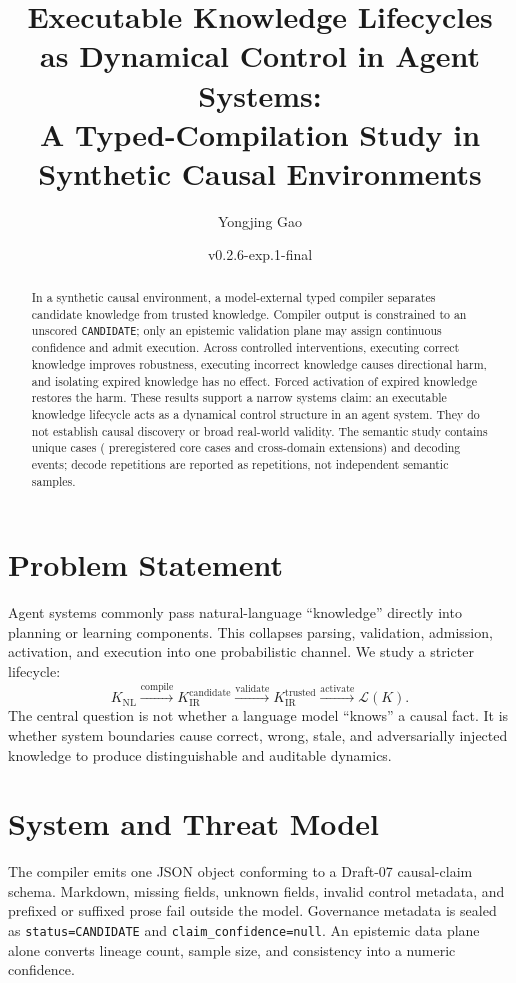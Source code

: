 \documentclass[10pt,twocolumn]{article}
\title{Executable Knowledge Lifecycles as Dynamical Control in Agent Systems:\\
A Typed-Compilation Study in Synthetic Causal Environments}
\author{Yongjing Gao}
\date{v0.2.6-exp.1-final}
\begin{document}
\maketitle

\begin{abstract}
In a synthetic causal environment, a model-external typed compiler separates candidate knowledge from trusted knowledge. Compiler output is constrained to an unscored \texttt{CANDIDATE}; only an epistemic validation plane may assign continuous confidence and admit execution. Across controlled interventions, executing correct knowledge improves robustness, executing incorrect knowledge causes directional harm, and isolating expired knowledge has no effect. Forced activation of expired knowledge restores the harm. These results support a narrow systems claim: an executable knowledge lifecycle acts as a dynamical control structure in an agent system. They do not establish causal discovery or broad real-world validity. The semantic study contains \UniqueCases{} unique cases (\CoreCases{} preregistered core cases and \ExtensionCases{} cross-domain extensions) and \TotalEvents{} decoding events; decode repetitions are reported as repetitions, not independent semantic samples.
\end{abstract}

\section{Problem Statement}
Agent systems commonly pass natural-language ``knowledge'' directly into planning or learning components. This collapses parsing, validation, admission, activation, and execution into one probabilistic channel. We study a stricter lifecycle:
\begin{equation}
K_{\mathrm{NL}} \xrightarrow{\text{compile}} K_{\mathrm{IR}}^{\mathrm{candidate}}
\xrightarrow{\text{validate}} K_{\mathrm{IR}}^{\mathrm{trusted}}
\xrightarrow{\text{activate}} \mathcal{L}(K).
\end{equation}
The central question is not whether a language model ``knows'' a causal fact. It is whether system boundaries cause correct, wrong, stale, and adversarially injected knowledge to produce distinguishable and auditable dynamics.

\section{System and Threat Model}
The compiler emits one JSON object conforming to a Draft-07 causal-claim schema. Markdown, missing fields, unknown fields, invalid control metadata, and prefixed or suffixed prose fail outside the model. Governance metadata is sealed as \texttt{status=CANDIDATE} and \texttt{claim\_confidence=null}. An epistemic data plane alone converts lineage count, sample size, and consistency into a numeric confidence.
\end{document}
